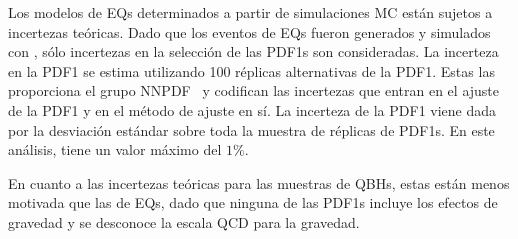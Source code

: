 Los modelos de \acp{EQ} determinados a partir de simulaciones \ac{MC} están sujetos a incertezas teóricas. 
Dado que los eventos de \acp{EQ} fueron generados y simulados con \Pythia, sólo incertezas en la selección de las \acp{PDF1} son consideradas.
La incerteza en la \ac{PDF1} se estima utilizando 100 réplicas alternativas de la \ac{PDF1}. Estas las proporciona el grupo NNPDF~\cite{NNPDF2} y codifican las incertezas que entran en el ajuste de la \ac{PDF1} y en el método de ajuste en sí. La incerteza de la \ac{PDF1} viene dada por la desviación estándar sobre toda la muestra de réplicas de \acp{PDF1}. En este análisis, tiene un valor máximo del \(1\%\).

En cuanto a las incertezas teóricas para las muestras de \acp{QBH}, estas están menos motivada que las de \acp{EQ}, dado que ninguna de las \acp{PDF1} incluye los efectos de gravedad y se desconoce la escala \ac{QCD} para la gravedad.